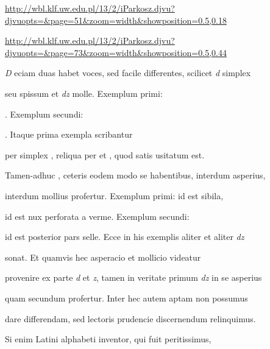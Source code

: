 
{
\url{http://wbl.klf.uw.edu.pl/13/2/iParkosz.djvu?djvuopts=&page=51&zoom=width&showposition=0.5,0.18}

\url{http://wbl.klf.uw.edu.pl/13/2/iParkosz.djvu?djvuopts=&page=73&zoom=width&showposition=0.5,0.44}
}

\bigskip

\obeylines
\mono








\fulllines

\indentK \textit{D} eciam duas habet voces, sed facile differentes, scilicet \textit{d} simplex

seu spissum et \textit{dz} molle. Exemplum primi:   

  . Exemplum secundi:    

   . Itaque prima exempla scribantur

per simplex , reliqua per  et , quod satis usitatum est.

\indentK Tamen-adhuc , ceteris eodem modo se habentibus, interdum asperius,

interdum mollius profertur. Exemplum primi:  id est sibila,

 id est nux perforata a verme. Exemplum secundi: 

id est posterior pars selle. Ecce in his exemplis aliter et aliter \textit{dz}

sonat. Et quamvis hec asperacio et mollicio videatur 

provenire ex parte \textit{d} et \textit{z}, tamen in veritate primum \textit{dz} in se asperius

quam secundum profertur. Inter hec autem aptam non possumus

dare differendam, sed lectoris prudencie discernendum relinquimus.

Si enim Latini alphabeti inventor, qui fuit peritissimus, 

